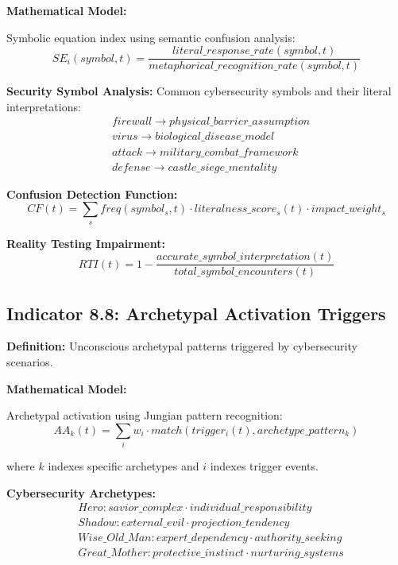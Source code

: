 \documentclass[11pt,a4paper]{article}
\begin{document}
\textbf{Mathematical Model:}

Symbolic equation index using semantic confusion analysis:
\begin{equation}
SE_i(symbol,t) = \frac{literal\_response\_rate(symbol,t)}{metaphorical\_recognition\_rate(symbol,t)}
\end{equation}

\textbf{Security Symbol Analysis:}
Common cybersecurity symbols and their literal interpretations:
\begin{align}
&firewall \rightarrow physical\_barrier\_assumption \\
&virus \rightarrow biological\_disease\_model \\
&attack \rightarrow military\_combat\_framework \\
&defense \rightarrow castle\_siege\_mentality
\end{align}

\textbf{Confusion Detection Function:}
\begin{equation}
CF(t) = \sum_{s} freq(symbol_s,t) \cdot literalness\_score_s(t) \cdot impact\_weight_s
\end{equation}

\textbf{Reality Testing Impairment:}
\begin{equation}
RTI(t) = 1 - \frac{accurate\_symbol\_interpretation(t)}{total\_symbol\_encounters(t)}
\end{equation}

\subsection{Indicator 8.8: Archetypal Activation Triggers}

\textbf{Definition:} Unconscious archetypal patterns triggered by cybersecurity scenarios.

\textbf{Mathematical Model:}

Archetypal activation using Jungian pattern recognition:
\begin{equation}
AA_k(t) = \sum_{i} w_i \cdot match(trigger_i(t), archetype\_pattern_k)
\end{equation}

where $k$ indexes specific archetypes and $i$ indexes trigger events.

\textbf{Cybersecurity Archetypes:}
\begin{align}
&Hero: savior\_complex \cdot individual\_responsibility \\
&Shadow: external\_evil \cdot projection\_tendency \\
&Wise\_Old\_Man: expert\_dependency \cdot authority\_seeking \\
&Great\_Mother: protective\_instinct \cdot nurturing\_systems
\end{align}
\end{document}
